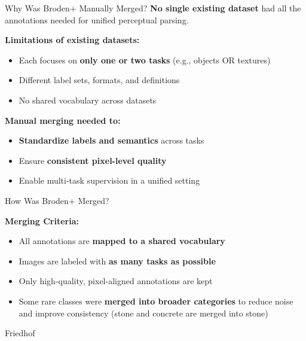 \documentclass{beamer}
\begin{document}
\begin{frame}{Why Was Broden+ Manually Merged?}
  \textbf{No single existing dataset} had all the annotations needed for unified perceptual parsing.

  \vspace{0.4cm}

  \textbf{Limitations of existing datasets:}
  \begin{itemize}
    \item Each focuses on \textbf{only one or two tasks} (e.g., objects OR textures)
    \item Different label sets, formats, and definitions
    \item No shared vocabulary across datasets
  \end{itemize}

  \vspace{0.4cm}

  \textbf{Manual merging needed to:}
  \begin{itemize}
    \item \textbf{Standardize labels and semantics} across tasks
    \item Ensure \textbf{consistent pixel-level quality}
    \item Enable multi-task supervision in a unified setting
  \end{itemize}
\end{frame}

\begin{frame}{How Was Broden+ Merged?}
  
  \textbf{Merging Criteria:}
  \begin{itemize}
    \item All annotations are \textbf{mapped to a shared vocabulary}
    \item Images are labeled with \textbf{as many tasks as possible}
    \item Only high-quality, pixel-aligned annotations are kept
    \item Some rare classes were \textbf{merged into broader categories} to reduce noise and improve consistency (stone and concrete are merged into stone)
  \end{itemize}
\end{frame}

\begin{frame}{Friedhof}

\end{frame}

\end{document}
